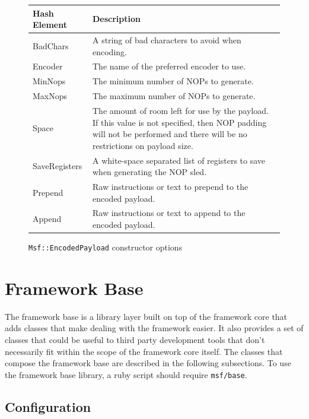 \documentclass{report}
\begin{document}
\begin{figure}[h]
\begin{center}
\begin{tabular}{|l|p{3.5in}|}
\hline
\textbf{Hash Element} & \textbf{Description} \\
\hline
BadChars & A string of bad characters to avoid when encoding. \\
\hline
Encoder & The name of the preferred encoder to use. \\
\hline
MinNops & The minimum number of NOPs to generate. \\
\hline
MaxNops & The maximum number of NOPs to generate. \\
\hline
Space & The amount of room left for use by the payload.  If this value is not specified, then NOP padding will not be performed and there will be no restrictions on payload size. \\
\hline
SaveRegisters & A white-space separated list of registers to save when generating the NOP sled. \\
\hline
Prepend & Raw instructions or text to prepend to the encoded payload. \\
\hline
Append & Raw instructions or text to append to the encoded payload. \\
\hline
\end{tabular}
\caption{\texttt{Msf::EncodedPayload} constructor options}
\label{fig-table-enc-payload-options}
\end{center}
\end{figure}

\chapter{Framework Base}

\par
The framework base is a library layer built on top of the framework
core that adds classes that make dealing with the framework easier.
It also provides a set of classes that could be useful to third
party development tools that don't necessarily fit within the scope
of the framework core itself.  The classes that compose the
framework base are described in the following subsections.  To use
the framework base library, a ruby script should require
\texttt{msf/base}.

    \section{Configuration}
\end{document}
